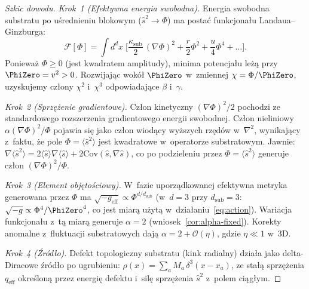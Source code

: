 \begin{proof}[Szkic dowodu]
\emph{Krok~1 (Efektywna energia swobodna).}
Energia swobodna substratu po u\'srednieniu blokowym
($\hat{s}^2 \to \Phi$) ma posta\'c funkcjona\l{}u
Landaua--Ginzburga:
\[
  \mathcal{F}[\Phi] = \int d^dx\;\biggl[
    \frac{\kappa_{\mathrm{sub}}}{2}\,(\nabla\Phi)^2
    + \frac{r}{2}\Phi^2 + \frac{u}{4}\Phi^4 + \ldots
  \biggr].
\]
Poniewa\.z $\Phi \geq 0$ (jest kwadratem amplitudy),
minima potencja\l{}u le\.z\k{a} przy $\PhiZero = v^2 > 0$.
Rozwijaj\k{a}c wok\'o\l{} $\PhiZero$ w~zmiennej
$\chi = \Phi/\PhiZero$, uzyskujemy cz\l{}ony $\chi^2$ i~$\chi^3$
odpowiadaj\k{a}ce $\beta$ i~$\gamma$.

\emph{Krok~2 (Sprz\k{e}\.zenie gradientowe).}
Cz\l{}on kinetyczny $(\nabla\Phi)^2/2$ pochodzi ze standardowego
rozszerzenia gradientowego energii swobodnej. Cz\l{}on nieliniowy
$\alpha(\nabla\Phi)^2/\Phi$ pojawia si\k{e} jako cz\l{}on wiod\k{a}cy
wy\.zszych rz\k{e}d\'ow w~$\nabla^2$, wynikaj\k{a}cy z~faktu,
\.ze pole $\Phi = \langle\hat{s}^2\rangle$ jest kwadratowe
w~operatorze substratowym.
Jawnie: $\nabla\langle\hat{s}^2\rangle
= 2\langle\hat{s}\rangle\nabla\langle\hat{s}\rangle
+ 2\mathrm{Cov}(\hat{s},\nabla\hat{s})$,
co po podzieleniu przez $\Phi = \langle\hat{s}^2\rangle$
generuje cz\l{}on $(\nabla\Phi)^2/\Phi$.

\emph{Krok~3 (Element obj\k{e}to\'sciowy).}
W~fazie uporz\k{a}dkowanej efektywna metryka generowana
przez $\Phi$ ma $\sqrt{-g_{\mathrm{eff}}} \propto \Phi^{d/d_{\mathrm{sub}}}$
(w~$d=3$ przy $d_{\mathrm{sub}} = 3$:
$\sqrt{-g} \propto \Phi^4/\PhiZero^4$,
co jest miar\k{a} u\.zyt\k{a} w~dzia\l{}aniu~\eqref{eq:action}).
Wariacja funkcjona\l{}u z~t\k{a} miar\k{a} generuje $\alpha = 2$
(wniosek~\ref{cor:alpha-fixed}). Korekty anomalne z~fluktuacji
substratowych daj\k{a} $\alpha = 2 + \mathcal{O}(\eta)$,
gdzie $\eta \ll 1$ w~3D.

\emph{Krok~4 (\'Zr\'od\l{}o).}
Defekt topologiczny substratu (kink radialny)
dzia\l{}a jako delta-Diracowe \'zr\'od\l{}o po ugrubieniu:
$\rho(x) = \sum_a M_a\,\delta^3(x - x_a)$,
ze sta\l{}\k{a} sprz\k{e}\.zenia $q_{\mathrm{eff}}$
okre\'slon\k{a} przez energi\k{e} defektu i~sil\k{e}
sprz\k{e}\.zenia $\hat{s}^2$ z~polem ci\k{a}g\l{}ym.
\end{proof}

